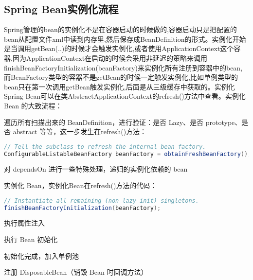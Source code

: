 \documentclass[../../../interview-questions.tex]{subfiles}
\begin{document}
\subsection{Spring Bean实例化流程}

Spring管理的bean的实例化不是在容器启动的时候做的,容器启动只是把配置的bean从配置文件xml中读到内存里,然后保存成BeanDefinition的形式。实例化开始是当调用getBean(..)的时候才会触发实例化,或者使用ApplicationContext这个容器,因为ApplicationContext在启动的时候会采用非延迟的策略来调用finishBeanFactoryInitialization(beanFactory)来实例化所有注册到容器中的bean,而BeanFactory类型的容器不是getBean的时候一定触发实例化,比如单例类型的bean只在第一次调用getBean触发实例化,后面是从三级缓存中获取的。实例化Spring Bean可以在类AbstractApplicationContext的refresh()方法中查看。实例化 Bean 的大致流程：

遍历所有扫描出来的 BeanDefinition，进行验证：是否 Lazy、是否 prototype、是否 abstract 等等，这一步发生在refresh()方法：

\begin{lstlisting}[language=Java]
// Tell the subclass to refresh the internal bean factory.
ConfigurableListableBeanFactory beanFactory = obtainFreshBeanFactory();  
\end{lstlisting}

对 dependsOn 进行一些特殊处理，递归的实例化依赖的 bean

实例化 Bean，实例化Bean在refresh()方法的代码：

\begin{lstlisting}[language=Java]
// Instantiate all remaining (non-lazy-init) singletons.
finishBeanFactoryInitialization(beanFactory);    
\end{lstlisting}


执行属性注入

执行 Bean 初始化

初始化完成，加入单例池

注册 DisposableBean（销毁 Bean 时回调方法）
\end{document}
